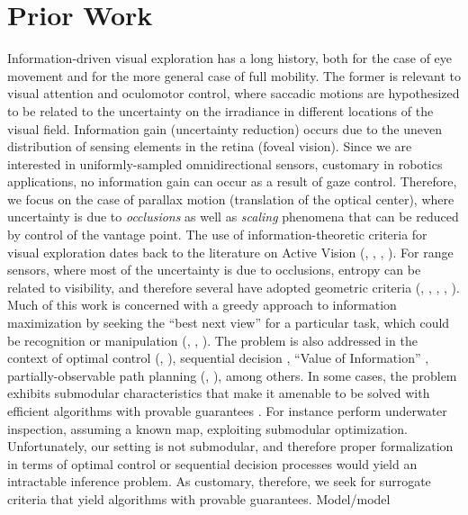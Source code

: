 \section{Prior Work}
Information-driven visual exploration has a long history, both for the case of eye movement and for the more general case of full mobility. The former is relevant to visual attention and oculomotor control, 
where saccadic motions are hypothesized to be related to the uncertainty on the irradiance in different locations of the visual field. Information gain (uncertainty reduction) occurs due to the uneven distribution
of sensing elements in the retina (foveal vision). Since we are interested in uniformly-sampled omnidirectional sensors, customary in robotics applications, no information gain can occur as a result of gaze control. 
Therefore, we focus on the case of parallax motion (translation of the optical center), where uncertainty is due to {\em occlusions} as well as {\em scaling} phenomena that can be reduced by control of the vantage point.
The use of information-theoretic criteria for visual exploration dates back to the literature on Active Vision (\cite{whaiteF97}, \cite{arbelF01}, \cite{yuG00}, \cite{burnsB03}). For range sensors, 
where most of the uncertainty is due to occlusions, entropy can be related to visibility, and therefore several have adopted geometric criteria (\cite{connolly85}, \cite{yuWY96}, \cite{yamauchi97}, \cite{grabowskiKC03}, 
\cite{valenteTS12}). Much of this work is concerned with a greedy approach to information maximization by seeking the ``best next view'' for a particular task, which could be recognition or manipulation (\cite{grabowskiKC03}, 
\cite{denzlerB02}, \cite{royCB04}).
The problem is also addressed in the context of optimal control (\cite{cassandraKL94}, \cite{SimD04}), sequential decision \cite{algoet94}, ``Value of Information'' \cite{dearden99}, 
partially-observable path planning (\cite{hauskrecht00}, \cite{kearnsMN99}), among others. In some cases, the problem exhibits submodular characteristics that make it amenable to be solved with
efficient algorithms with provable guarantees \cite{krauseG07}. For instance \cite{hollinger12} perform underwater inspection, assuming a known map, exploiting submodular optimization. Unfortunately, 
our setting is not submodular, and therefore proper formalization in terms of optimal control or sequential decision processes would yield an intractable inference problem. As customary, therefore, we seek for 
surrogate criteria that yield algorithms with provable guarantees.
% 
{Model/model}
